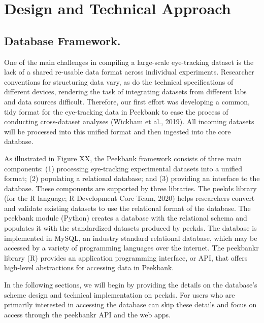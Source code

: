 \documentclass[
  english,
  man,floatsintext]{apa6}
\begin{document}
\hypertarget{design-and-technical-approach}{%
\section{Design and Technical Approach}\label{design-and-technical-approach}}

\hypertarget{database-framework.}{%
\subsection{Database Framework.}\label{database-framework.}}

One of the main challenges in compiling a large-scale eye-tracking dataset is the lack of a shared re-usable data format across individual experiments. Researcher conventions for structuring data vary, as do the technical specifications of different devices, rendering the task of integrating datasets from different labs and data sources difficult. Therefore, our first effort was developing a common, tidy format for the eye-tracking data in Peekbank to ease the process of conducting cross-dataset analyses (Wickham et al., 2019). All incoming datasets will be processed into this unified format and then ingested into the core database.

As illustrated in Figure XX, the Peekbank framework consists of three main components: (1) processing eye-tracking experimental datasets into a unified format; (2) populating a relational database; and (3) providing an interface to the database. These components are supported by three libraries. The peekds library (for the R language; R Development Core Team, 2020) helps researchers convert and validate existing datasets to use the relational format of the database. The peekbank module (Python) creates a database with the relational schema and populates it with the standardized datasets produced by peekds. The database is implemented in MySQL, an industry standard relational database, which may be accessed by a variety of programming languages over the internet. The peekbankr library (R) provides an application programming interface, or API, that offers high-level abstractions for accessing data in Peekbank.

In the following sections, we will begin by providing the details on the database's scheme design and technical implementation on peekds. For users who are primarily interested in accessing the database can skip these details and focus on access through the peekbankr API and the web apps.
\end{document}
